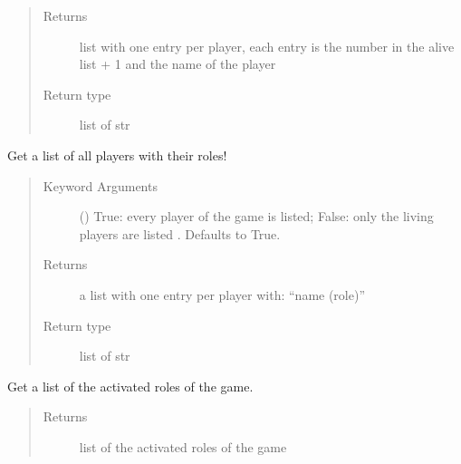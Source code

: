 \documentclass[letterpaper,10pt,english]{sphinxmanual}
\begin{document}
\begin{fulllineitems}
\begin{fulllineitems}
\begin{quote}
\begin{description}
\item[{Returns}] \leavevmode
list with one entry per player, each entry is the number in the alive list + 1 and the name of the player

\item[{Return type}] \leavevmode
list of str

\end{description}\end{quote}

\end{fulllineitems}


\begin{fulllineitems}
\label{\detokenize{chatwolf:chatwolf.game.Game.get_players_role}}
Get a list of all players with their roles!
\begin{quote}\begin{description}
\item[{Keyword Arguments}] \leavevmode
{} (\sphinxstyleliteralemphasis{\sphinxupquote{, }}) \textendash{} True: every player of the game is listed; False: only the living players are listed . Defaults to True.

\item[{Returns}] \leavevmode
a list with one entry per player with: “name (role)”

\item[{Return type}] \leavevmode
list of str

\end{description}\end{quote}

\end{fulllineitems}


\begin{fulllineitems}
\label{\detokenize{chatwolf:chatwolf.game.Game.get_roles}}
Get a list of the activated roles of the game.
\begin{quote}\begin{description}
\item[{Returns}] \leavevmode
list of the activated roles of the game


\end{description}
\end{quote}
\end{fulllineitems}
\end{fulllineitems}
\end{document}
